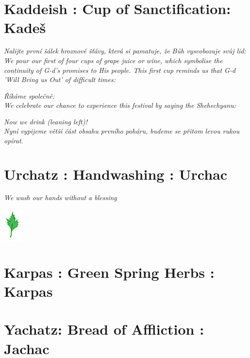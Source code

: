 \documentclass[a5paper,10pt]{memoir}
\begin{document}
\section{Kaddeish : Cup of Sanctification: Kadeš}
\begin{paracol}{2}
	{\textit{Nalijte první šálek hroznové šťávy, která si pamatuje, že Bůh vysvobozuje svůj lid:}\\
	\color{midblue}\textit{We pour our first of four cups of grape juice or wine, which symbolise the continuity of G-d's promises to His people. This first cup reminds us that G-d 'Will Bring us Out' of difficult times:}}
\end{paracol}
\Kaddeish
\onecolumn
\textit{Říkáme společně:}
\\
\color{midblue}\textit{We celebrate our chance to experience this festival by saying the Shehechyanu:}
\color{black}
\Shehechyanu
\begin{center}
	\textit{\centering \color{midblue} Now we drink (leaning left)!} \\
	\textit{Nyní  vypijeme větší část obsahu prvního poháru, budeme se přitom levou rukou opírat.}
	\end{center}

\section{Urchatz : Handwashing : Urchac}
\begin{center}
	{\color{midblue} \textit{We wash our hands without a blessing}}\\
	\urchatz
	\end{center}
% 
\vspace*{-3ex}
\hfill\includegraphics[width=10mm]{Karpas}
\vspace*{-12ex}  %
\section{Karpas : Green Spring Herbs : Karpas}
 \Karpas

\section{Yachatz: Bread of Affliction : Jachac}
\Yachatz
\end{document}
